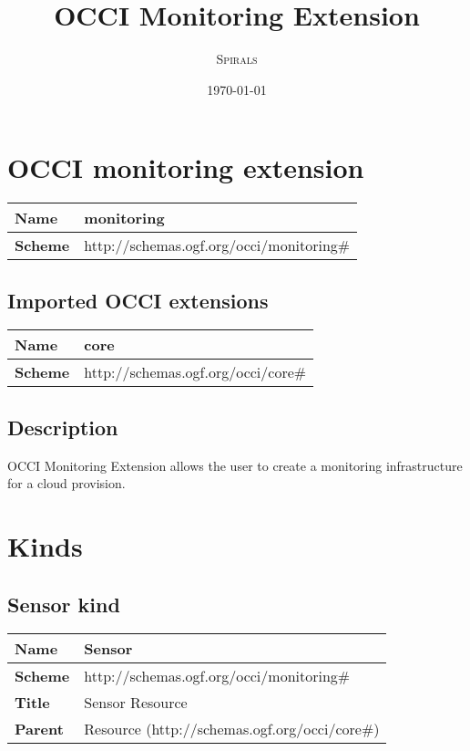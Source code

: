 \documentclass{article}
\title{OCCI Monitoring Extension} %
\author{\textsc{Spirals}} %
\date{\today} %
\begin{document}
 

\maketitle %
\newpage
\section{OCCI monitoring extension}
\begin{center}
\begin{tabular}{|l|l|}
  \hline
  \textbf{Name} & monitoring \\
  \hline  
  \textbf{Scheme} & http://schemas.ogf.org/occi/monitoring\# \\
  \hline
\end{tabular}
\end{center}
\subsection{Imported OCCI extensions}

\begin{center} 
\begin{tabular}{|l|l|}
  \hline
  \textbf{Name} & core \\
  \hline  
  \textbf{Scheme} & http://schemas.ogf.org/occi/core\# \\
  \hline
\end{tabular}
\end{center}

\subsection{Description}
OCCI Monitoring Extension allows the user to create a monitoring infrastructure for a cloud provision.
\section{Kinds}
\subsection{Sensor kind}
\begin{center}
\begin{tabular}{|l|l|}
  \hline
  \textbf{Name} & Sensor \\
  \hline  
  \textbf{Scheme} & http://schemas.ogf.org/occi/monitoring\# \\
  \hline
  \textbf{Title} & Sensor Resource \\
  \hline
  \textbf{Parent} & Resource (http://schemas.ogf.org/occi/core\#) \\
  \hline
\end{tabular}
\end{center}
\end{document}
